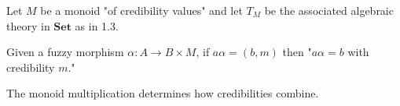 Let $M$ be a monoid "of credibility values" and let $T_M$ be the associated algebraic theory in $\mathbf{Set}$ as in 1.3.

Given a fuzzy morphism $\alpha : A \longrightarrow B \times M$, if $a\alpha = (b, m)$ then "$a\alpha = b$ with credibility $m$."

The monoid multiplication determines how credibilities combine.

